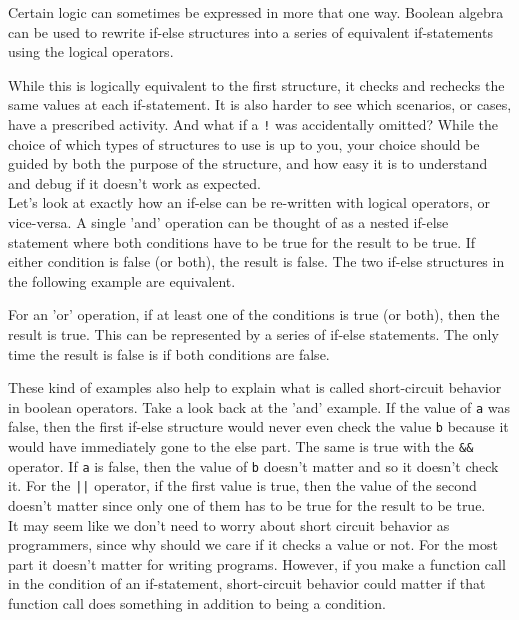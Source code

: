 Certain logic can sometimes be expressed in more that one way. Boolean algebra can be used to rewrite if-else structures into a series of equivalent  if-statements using the logical operators.


While this is logically equivalent to the first structure, it checks and rechecks the same values at each if-statement. It is also harder to see which scenarios, or cases, have a prescribed activity. And what if a \texttt{!} was accidentally omitted? While the choice of which types of structures to use is up to you, your choice should be guided by both the purpose of the structure, and how easy it is to understand and debug if it doesn't work as expected.\\

Let's look at exactly how an if-else can be re-written with logical operators, or vice-versa. A single 'and' operation can be thought of as a nested if-else statement where both conditions have to be true for the result to be true. If either condition is false (or both), the result is false. The two if-else structures in the following example are equivalent.



For an 'or' operation, if at least one of the conditions is true (or both), then the result is true. This can be represented by a series of if-else statements. The only time the result is false is if both conditions are false.



These kind of examples also help to explain what is called short-circuit behavior in boolean operators. Take a look back at the 'and' example. If the value of \texttt{a} was false, then the first if-else structure would never even check the value \texttt{b} because it would have immediately gone to the else part. The same is true with the \texttt{\&\&} operator. If \texttt{a} is false, then the value of \texttt{b} doesn't matter and so it doesn't check it. For the \texttt{||} operator, if the first value is true, then the value of the second doesn't matter since only one of them has to be true for the result to be true.\\

It may seem like we don't need to worry about short circuit behavior as programmers, since why should we care if it checks a value or not. For the most part it doesn't matter for writing programs. However, if you make a function call in the condition of an if-statement, short-circuit behavior could matter if that function call does something in addition to being a condition.

